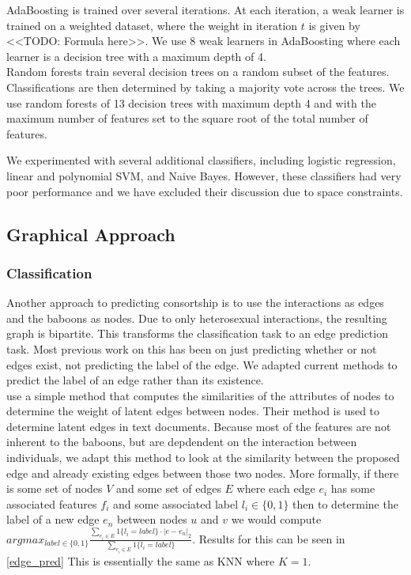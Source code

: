 \documentclass[twoside,twocolumn,paper=letter,fontsize=11pt]{article}
\begin{document}
AdaBoosting is trained over several iterations. At each iteration, a weak
learner is trained on a weighted dataset, where the weight in iteration $t$ is
given by <<TODO: Formula here>>. We use 8 weak learners in AdaBoosting
where each learner is a decision tree with a maximum depth of 4.\\

Random forests train several decision trees on a random subset of the features.
Classifications are then determined by taking a majority vote across the trees.
We use random forests of 13 decision trees with maximum depth 4 and with the
maximum number of features set to the square root of the total number of
features.

We experimented with several additional classifiers, including logistic
regression, linear and polynomial SVM, and Naive Bayes. However, these
classifiers had very poor performance and we have excluded their discussion due
to space constraints.

\subsection{Graphical Approach}

\subsubsection*{Classification}
Another approach to predicting consortship is to use the interactions as edges
and the baboons as nodes. Due to only heterosexual interactions, the resulting
graph is bipartite. This transforms the classification task to an edge
prediction task. Most previous work on this has been on just predicting whether
or not edges exist, not predicting the label of the edge. We adapted current
methods to predict the label of an edge rather than its existence.\\ 

\cite{Macskassy:2007} use a simple method that computes the similarities of the
attributes of nodes to determine the weight of latent edges between nodes. Their method is used to determine latent edges in text documents. Because most of the features are not inherent to the baboons, but are
depdendent on the interaction between individuals, we adapt this method to look
at the similarity between the proposed edge and already existing edges between
those two nodes. More formally, if there is some set of nodes $V$ and some set
of edges $E$ where each edge $e_i$ has some associated features $f_i$ and some
associated label $l_i\in \{0,1\}$ then to determine the label of a new edge
$e_n$ between nodes $u$ and $v$ we would compute $argmax_{label \in \{0,1\}}
\frac{\sum_{e_i \in E}1\{l_i=label\}\cdot|e-e_n|_2}{\sum_{e_i \in
E}1\{l_i=label\}}$. Results for this can be seen in \ref{edge_pred}  This is essentially the same as KNN where $K=1$. %
\end{document}
